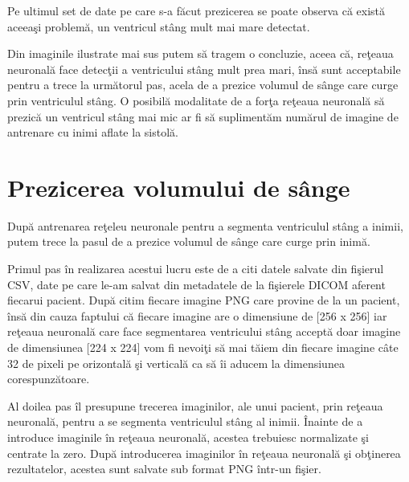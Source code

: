 Pe ultimul set de date pe care s-a f\u{a}cut prezicerea se poate observa c\u{a} exist\u{a} aceea\c{s}i problem\u{a}, un ventricul st\^{a}ng mult mai mare detectat.

\par

Din imaginile ilustrate mai sus putem s\u{a} tragem o concluzie, aceea c\u{a}, re\c{t}eaua neuronal\u{a} face detec\c{t}ii a ventricului st\^{a}ng mult prea mari, \^{i}ns\u{a} sunt acceptabile pentru a trece la urm\u{a}torul pas, acela de a prezice volumul de s\^{a}nge care curge prin ventriculul st\^{a}ng. O posibil\u{a} modalitate de a for\c{t}a re\c{t}eaua neuronal\u{a} s\u{a} prezic\u{a} un ventricul st\^{a}ng mai mic ar fi s\u{a} supliment\u{a}m num\u{a}rul de imagine de antrenare cu inimi aflate la sistol\u{a}.

\section{Prezicerea volumului de s\^{a}nge}

Dup\u{a} antrenarea re\c{t}eleu neuronale pentru a segmenta ventriculul st\^{a}ng a inimii, putem trece la pasul de a prezice volumul de s\^{a}nge care curge prin inim\u{a}.

\par

Primul pas \^{i}n realizarea acestui lucru este de a citi datele salvate din fi\c{s}ierul CSV, date pe care le-am salvat din metadatele de la fi\c{s}ierele DICOM aferent fiecarui pacient. Dup\u{a} citim fiecare imagine PNG care provine de la un pacient, \^{i}ns\u{a} din cauza faptului c\u{a} fiecare imagine are o dimensiune de [256 x 256] iar re\c{t}eaua neuronal\u{a} care face segmentarea ventricului st\^{a}ng accept\u{a} doar imagine de dimensiunea [224 x 224] vom fi nevoi\c{t}i s\u{a} mai t\u{a}iem din fiecare imagine c\^{a}te 32 de pixeli pe orizontal\u{a} \c{s}i vertical\u{a} ca s\u{a} \^{i}i aducem la dimensiunea corespunz\u{a}toare.

\par

Al doilea pas \^{i}l presupune trecerea imaginilor, ale unui pacient, prin re\c{t}eaua neuronal\u{a}, pentru a se segmenta ventriculul st\^{a}ng al inimii. \^{I}nainte de a introduce imaginile \^{i}n re\c{t}eaua neuronal\u{a}, acestea trebuiesc normalizate \c{s}i centrate la zero. Dup\u{a} introducerea imaginilor \^{i}n re\c{t}eaua neuronal\u{a} \c{s}i ob\c{t}inerea rezultatelor, acestea sunt salvate sub format PNG \^{i}ntr-un fi\c{s}ier.


